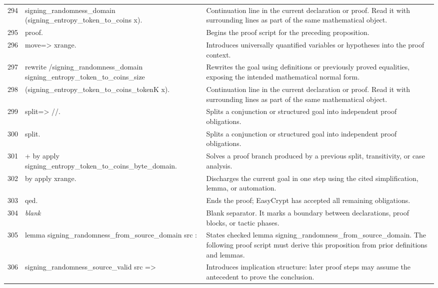 \documentclass[10pt]{article}
\begin{document}
\begin{longtable}{r L{0.53\textwidth} L{0.37\textwidth}}
294 & {\ttfamily\scriptsize   signing\_randomness\_domain (signing\_entropy\_token\_to\_coins x).} & Continuation line in the current declaration or proof.  Read it with surrounding lines as part of the same mathematical object. \\
295 & {\ttfamily\scriptsize proof.} & Begins the proof script for the preceding proposition. \\
296 & {\ttfamily\scriptsize move=> xrange.} & Introduces universally quantified variables or hypotheses into the proof context. \\
297 & {\ttfamily\scriptsize rewrite /signing\_randomness\_domain signing\_entropy\_token\_to\_coins\_size} & Rewrites the goal using definitions or previously proved equalities, exposing the intended mathematical normal form. \\
298 & {\ttfamily\scriptsize         (signing\_entropy\_token\_to\_coins\_tokenK x).} & Continuation line in the current declaration or proof.  Read it with surrounding lines as part of the same mathematical object. \\
299 & {\ttfamily\scriptsize split=> //.} & Splits a conjunction or structured goal into independent proof obligations. \\
300 & {\ttfamily\scriptsize split.} & Splits a conjunction or structured goal into independent proof obligations. \\
301 & {\ttfamily\scriptsize + by apply signing\_entropy\_token\_to\_coins\_byte\_domain.} & Solves a proof branch produced by a previous split, transitivity, or case analysis. \\
302 & {\ttfamily\scriptsize by apply xrange.} & Discharges the current goal in one step using the cited simplification, lemma, or automation. \\
303 & {\ttfamily\scriptsize qed.} & Ends the proof; EasyCrypt has accepted all remaining obligations. \\
304 & {\ttfamily\scriptsize \emph{blank}} & Blank separator.  It marks a boundary between declarations, proof blocks, or tactic phases. \\
305 & {\ttfamily\scriptsize lemma signing\_randomness\_from\_source\_domain src :} & States checked lemma signing\_randomness\_from\_source\_domain.  The following proof script must derive this proposition from prior definitions and lemmas. \\
306 & {\ttfamily\scriptsize   signing\_randomness\_source\_valid src =>} & Introduces implication structure: later proof steps may assume the antecedent to prove the conclusion. \\

\end{longtable}
\end{document}
